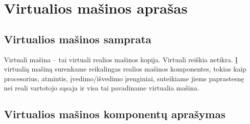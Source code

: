 \section{Virtualios mašinos aprašas}

\subsection{Virtualios mašinos samprata}

Virtuali mašina – tai virtuali realios mašinos kopija. Virtuali reiškia netikra. Į virtualią mašiną surenkame reikalingas realios mašinos komponentes, tokias kaip procesorius, atmintis, įvedimo/išvedimo įrenginiai, suteikiame jiems paprastesnę nei reali vartotojo sąsaja ir visa tai pavadiname virtualia mašina.

\subsection{Virtualios mašinos komponentų aprašymas}
